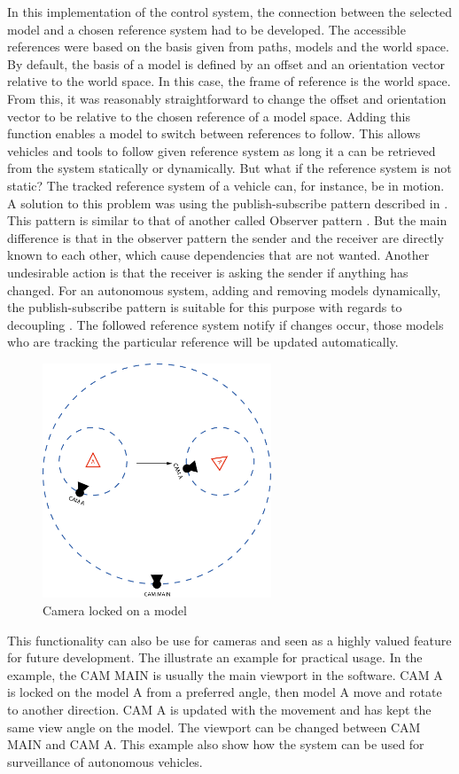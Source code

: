In this implementation of the control system, the connection between the selected model and a chosen reference system had to be developed. The accessible references were based on the basis given from paths, models and the world space. By default, the basis of a model is defined by an offset and an orientation vector relative to the world space. In this case, the frame of reference is the world space. From this, it was reasonably straightforward to change the offset and orientation vector to be relative to the chosen reference of a model space. Adding this function enables a model to switch between references to follow. This allows vehicles and tools to follow given reference system as long it a can be retrieved from the system statically or dynamically. But what if the reference system is not static? The tracked reference system of a vehicle can, for instance, be in motion. A solution to this problem was using the publish-subscribe pattern described in . This pattern is similar to that of another called Observer pattern \cite{observer_pattern}. But the main difference is that in the observer pattern the sender and the receiver are directly known to each other, which cause dependencies that are not wanted. Another undesirable action is that the receiver is asking the sender if anything has changed. For an autonomous system, adding and removing models dynamically, the publish-subscribe pattern is suitable for this purpose with regards to decoupling \cite{decoupling}. The followed reference system notify if changes occur, those models who are tracking the particular reference will be updated automatically.  

\begin{figure}[ht]
    \centering
    \includegraphics[height=7cm]{images/cam_ex.png}
    \caption[Camera locked on a model]{Camera locked on a model}
    \label{fig:cam_ex}
\end{figure}

This functionality can also be use for cameras and seen as a highly valued feature for future development. The  illustrate an example for practical usage. In the example, the CAM MAIN is usually the main viewport in the software. CAM A is locked on the model A from a preferred angle, then model A move and rotate to another direction. CAM A is updated with the movement and has kept the same view angle on the model. The viewport can be changed between CAM MAIN and CAM A. This example also show how the system can be used for surveillance of autonomous vehicles. 